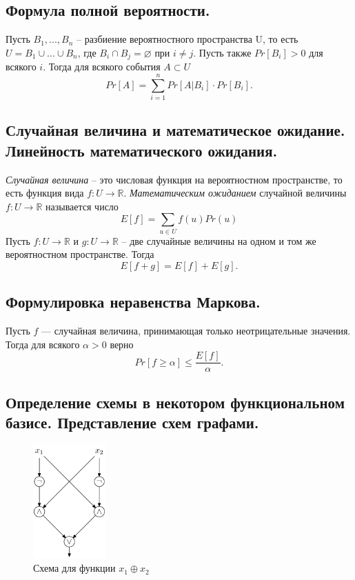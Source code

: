 \subsection{Формула полной вероятности.}
Пусть $B_1,...,B_n$ -- разбиение вероятностного пространства U, то есть $U = B_1 \cup ... \cup B_n$, где $B_i \cap B_j = \varnothing$ при $i \neq j$. Пусть также $Pr[B_i] > 0$ для всякого $i$. Тогда для всякого события $A \subset U$
\[
Pr[A] = \sum_{i=1}^n Pr[A | B_i] \cdot Pr[B_i].
\]




\subsection{Случайная величина и математическое ожидание. Линейность математического ожидания.}
\textit{Случайная величина} -- это числовая функция на вероятностном пространстве, то есть функция вида $f : U \to \mathbb{R}$.
\newline
\newline
\textit{Математическим ожиданием} случайной величины $f : U \to \mathbb{R}$ называется число
\[
E[f] = \sum_{u \in U} f(u)Pr(u)
\]
\newline
Пусть $f : U \to \mathbb{R}$ и $g : U \to \mathbb{R}$ -- две случайные величины на одном и том же вероятностном пространстве. Тогда
\[
E[f + g] = E[f] + E[g]. 
\]



\subsection{Формулировка неравенства Маркова.}
Пусть $f$ — случайная величина, принимающая только неотрицательные значения. Тогда для всякого $\alpha > 0$ верно
\[
Pr[f \geqslant \alpha] \leqslant \frac{E[f]}{\alpha}.
\]

\subsection{Определение схемы в некотором функциональном базисе. Представление схем графами.}
\begin{figure}
    \centering
    \includegraphics[width=0.25\textwidth]{graph}
    \caption{Схема для функции $x_1 \oplus x_2$}
\end{figure}


